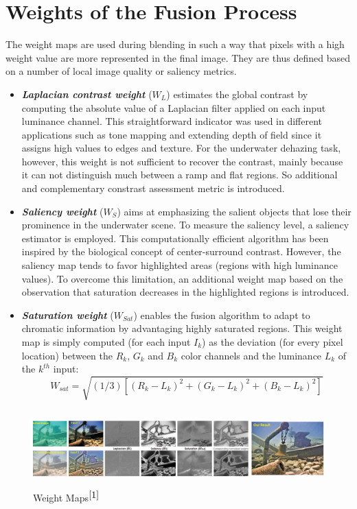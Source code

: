 \documentclass[hidelinks, 12pt]{report}
\begin{document}
\section{Weights of the Fusion Process}
The weight maps are used during blending in such a way that pixels with a high weight value are more represented in the final image. They are thus defined based on a number of local image quality or saliency metrics.
\begin{itemize}
\item{\textbf{\textit{Laplacian contrast weight}} ($W_L$) estimates the global contrast by computing the absolute value of a Laplacian filter applied on each input luminance channel. This straightforward indicator was used in different applications such as tone mapping and extending depth of field since it assigns high values to edges and texture. For the underwater dehazing task, however, this weight is not sufficient to recover the contrast, mainly because it can not distinguish much between a ramp and flat regions. So additional and complementary constrast assessment metric is introduced.}
\item{\textbf{\textit{Saliency weight}} ($W_S$) aims at emphasizing the salient objects that lose their prominence in the underwater scene. To measure the saliency level, a saliency estimator is employed. This computationally efficient algorithm has been inspired by the biological concept of center-surround contrast. However, the saliency map tends to favor highlighted areas (regions with high luminance values). To overcome this limitation, an additional weight map based on the observation that saturation decreases in the highlighted regions is introduced.}
\item{\textbf{\textit{Saturation weight}} ($W_{Sat}$) enables the fusion algorithm to adapt to chromatic information by advantaging highly saturated regions. This weight map is simply computed (for each input $I_k$) as the deviation (for every pixel location) between the $R_k$, $G_k$ and $B_k$ color channels and the luminance $L_k$ of the $k^{th}$ input:
\begin{equation}
W_{sat}=\sqrt{(1/3)[(R_k-L_k)^2+(G_k-L_k)^2+(B_k-L_k)^2]}
\end{equation}
}
\end{itemize}
\begin{figure}[H]
\centering
\includegraphics[width=15cm,height=3cm]{Weight.png}
\caption[Weight Maps]{Weight Maps$^{\cite{1}}$}
\label{Weight}
\end{figure}
\end{document}
